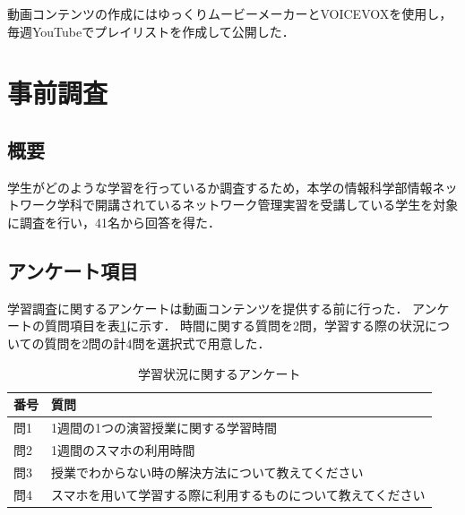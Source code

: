 \documentclass[12pt,a4j,titlepage]{ltjsarticle}
\begin{document}



動画コンテンツの作成にはゆっくりムービーメーカーとVOICEVOXを使用し，毎週YouTubeでプレイリストを作成して公開した．

\clearpage

\section{事前調査}
\subsection{概要}
学生がどのような学習を行っているか調査するため，本学の情報科学部情報ネットワーク学科で開講されているネットワーク管理実習を受講している学生を対象に調査を行い，41名から回答を得た．


\subsection{アンケート項目}
学習調査に関するアンケートは動画コンテンツを提供する前に行った．
アンケートの質問項目を表\ref{tb:anke1}に示す．
時間に関する質問を2問，学習する際の状況についての質問を2問の計4問を選択式で用意した．

\begin{table}[htbp]
  \caption{学習状況に関するアンケート}
  \begin{center}
\begin{tabular}{ll}\hline
               番号 & 質問 \\ \hline
               問1 & 1週間の1つの演習授業に関する学習時間\\
               問2 & 1週間のスマホの利用時間\\
               問3 & 授業でわからない時の解決方法について教えてください\\
               問4 & スマホを用いて学習する際に利用するものについて教えてください\\
              \hline
               \end{tabular}
               \end{center}
               \label{tb:anke1}
               \end{table}
\end{document}
